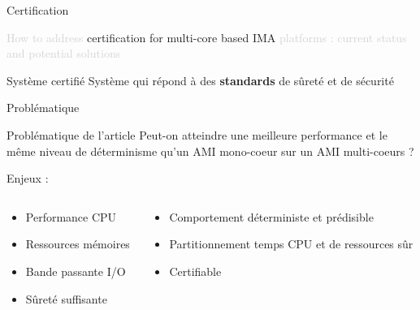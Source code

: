 \documentclass{beamer}
\begin{document}
\begin{frame}[t]{Certification} 
  
  \begin{center}
    \begin{mdframed}[style=yellowbox]
      {\small\textcolor{lightgray}{How to address} certification for multi-core based IMA \textcolor{lightgray}{platforms :
       current status and potential solutions}}
       \end{mdframed}
  \end{center}

	\begin{block}{Système certifié}
	 Système qui répond à des \textbf{standards} de sûreté et de sécurité
	\end{block}

\end{frame}

\begin{frame}{Problématique} 

	\begin{block}{Problématique de l'article}
	Peut-on atteindre une meilleure performance et le même niveau de déterminisme qu'un AMI mono-coeur sur un 
	AMI multi-coeurs ?
	\end{block}

	  Enjeux : \pause
  \begin{columns}
	  \begin{column}{0.45\textwidth}
		  \begin{itemize}
		  	\item Performance CPU \pause
			\item Ressources mémoires\pause
			\item Bande passante I/O \pause
			\item Sûreté suffisante \pause
		  \end{itemize}
	  \end{column}
	  \begin{column}{0.45\textwidth}
		  \begin{itemize}
			  \item Comportement déterministe et prédisible \pause
		      \item Partitionnement temps CPU et de ressources sûr \pause
			  \item Certifiable
		  \end{itemize}
	  \end{column}
  \end{columns}
 
\end{frame}
\end{document}
